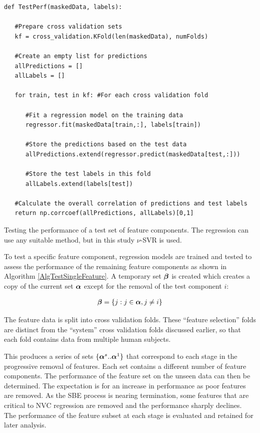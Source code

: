 \begin{algorithm}
\scriptsize 
\lstset{language=Python}
\begin{lstlisting}[frame=single]
def TestPerf(maskedData, labels):

   #Prepare cross validation sets
   kf = cross_validation.KFold(len(maskedData), numFolds)

   #Create an empty list for predictions
   allPredictions = [] 
   allLabels = []

   for train, test in kf: #For each cross validation fold

      #Fit a regression model on the training data
      regressor.fit(maskedData[train,:], labels[train])

      #Store the predictions based on the test data
      allPredictions.extend(regressor.predict(maskedData[test,:])) 

      #Store the test labels in this fold
      allLabels.extend(labels[test]) 

   #Calculate the overall correlation of predictions and test labels
   return np.corrcoef(allPredictions, allLabels)[0,1]
\end{lstlisting}
\normalsize
\caption{Testing the performance of a test set of feature components. The regression can use any suitable method, but in this study $\nu$-SVR is used.}
\label{AlgTestSingleFeature}
\end{algorithm}

To test a specific feature component, regression models are trained and tested to assess the performance of the remaining feature components as shown in Algorithm \ref{AlgTestSingleFeature}. %
A temporary set $\boldsymbol\beta$ is created which creates a copy of the current set $\boldsymbol\alpha$ except for the removal of the test component $i$:

\begin{gather}
\boldsymbol\beta = \{j: j \in \boldsymbol\alpha, j \ne i\}
\end{gather}

The feature data is split into cross validation folds. These ``feature selection'' folds are distinct from the ``system'' cross validation folds discussed earlier, so that each fold contains data from multiple human subjects.

This produces a series of sets $\{\boldsymbol\alpha^s..\boldsymbol\alpha^1\}$ that correspond to each stage in the progressive removal of features. Each set contains a different number of feature components. The performance of the feature set on the unseen data can then be determined. The expectation is for an increase in performance as poor features are removed. As the \ac{SBE} process is nearing termination, some features that are critical to \ac{NVC} regression are removed and the performance sharply declines. The performance of the feature subset at each stage is evaluated and retained for later analysis.

